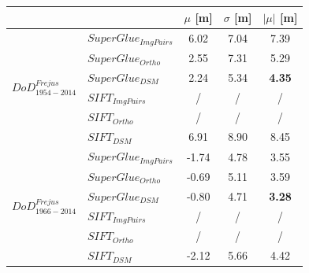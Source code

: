 \begin{table}%
	\footnotesize
	\centering
	\begin{tabular}{||l|l|c|c|c||}\hline
		& &$\mu$ [m]&$\sigma$ [m]&$|\mu|$ [m]\\\hline\hline
%		
%		
				\multirow{6}{*}{$DoD^{Frejus}_{1954-2014}$}
				&${SuperGlue_{ImgPairs}}$ & 6.02 & 7.04 & 7.39\\
&${SuperGlue_{Ortho}}$ & 2.55 & 7.31 & 5.29\\
&${SuperGlue_{DSM}}$ & 2.24 & 5.34 & \textbf{4.35}\\
		&${SIFT_{ImgPairs}}$ & / & / & / \\
		&${SIFT_{Ortho}}$ & / & / & / \\
&${SIFT_{DSM}}$ & 6.91 & 8.90 & 8.45\\\hline
		
		\multirow{6}{*}{$DoD^{Frejus}_{1966-2014}$}
				&${SuperGlue_{ImgPairs}}$ & -1.74 & 4.78 & 3.55\\
&${SuperGlue_{Ortho}}$ & -0.69 & 5.11 & 3.59\\
&${SuperGlue_{DSM}}$ & -0.80 & 4.71 & \textbf{3.28}\\
		&${SIFT_{ImgPairs}}$ & / & / & / \\
		&${SIFT_{Ortho}}$ & / & / & / \\
&${SIFT_{DSM}}$ & -2.12 & 5.66 & 4.42\\\hline
		

\end{tabular}
\end{table}
